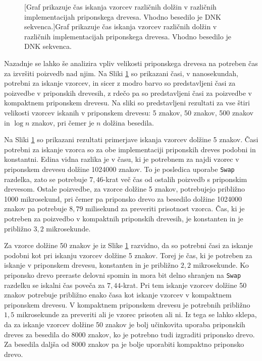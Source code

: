 \begin{figure}[htb]
    
    [Graf prikazuje čas iskanja vzorcev različnih dolžin v različnih implementacijah priponskega drevesa. Vhodno besedilo je DNK sekvenca.]{Graf prikazuje čas iskanja vzorcev različnih dolžin v različnih implementacijah priponskega drevesa. Vhodno besedilo je DNK sekvenca.} 
    \label{fig:IskanjeGraf}
\end{figure}

Nazadnje se lahko še analizira vpliv velikosti priponskega drevesa na potreben čas za izvršiti poizvedb nad njim. Na Sliki \ref{fig:IskanjeGraf} so prikazani časi, v nanosekundah, potrebni za iskanje vzorcev, in sicer z modro barvo so predstavljeni časi za poizvedbe v priponskih drevesih, z rdečo pa so predstavljeni časi za poizvedbe v kompaktnem priponskem drevesu. Na sliki so predstavljeni rezultati za vse štiri velikosti vzorcev iskanih v priponskem drevesu: 5 znakov, 50 znakov, 500 znakov in $\log{n}$ znakov, pri čemer je $n$ dolžina besedila.

Na Sliki \ref{fig:IskanjeGraf} so prikazani rezultati primerjave iskanja vzorcev dolžine 5 znakov. Časi potrebni za iskanje vzorca so za obe implementaciji priponskih dreves podobni in konstantni. Edina vidna razlika je v času, ki je potrebnem za najdi vzorec v priponskem drevesu dolžine 1024000 znakov. To je posledica uporabe \verb|Swap| razdelka, zato se potrebuje $7,46$-krat več čas od ostalih poizvedb s priponskim drevesom. Ostale poizvedbe, za vzorce dolžine 5 znakov, potrebujejo približno 1000 mikrosekund, pri čemer pa priponsko drevo za besedilo dolžine 1024000 znakov pa potrebuje $8,79$ milisekund za preveriti prisotnost vzorca. Čas, ki je potreben za poizvedbo v kompaktnih priponskih drevesih, je konstanten in je približno $3,2$ mikrosekunde.

Za vzorce dolžine 50 znakov je iz Slike \ref{fig:IskanjeGraf} razvidno, da so potrebni časi za iskanje podobni kot pri iskanju vzorcev dolžine 5 znakov. Torej je čas, ki je potreben za iskanje v priponskem drevesu, konstanten in je  približno $2,2$ mikrosekunde. Ko priponsko drevo preraste delovni spomin in mora bit delno shranjen na \verb|Swap| razdelku se iskalni čas poveča za  $7,44$-krat. Pri tem iskanje vzorcev dolžine 50 znakov potrebuje približno enako časa kot iskanje vzorcev v kompaktnem priponskem drevesu. V kompaktnem priponskem drevesu je potrebnih približno $1,5$ mikrosekunde za preveriti ali je vzorec prisoten ali ni. Iz tega se lahko sklepa, da za iskanje vzorcev dolžine 50 znakov je bolj učinkovita uporaba priponskih dreves za besedila do 8000 znakov, ko je potrebno tudi izgraditi priponsko drevo. Za besedila daljša od 8000 znakov pa je bolje uporabiti kompaktno priponsko drevo.

